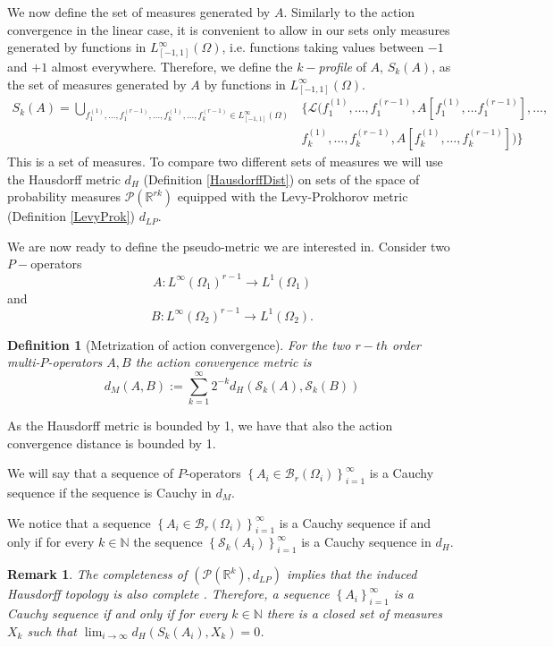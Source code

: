 \documentclass[11pt]{article}
\newtheorem{definition}[theorem]{Definition}
\newtheorem{remark}[theorem]{Remark}
\begin{document}
We now define the set of measures generated by $A$. Similarly to the action convergence in the linear case, it is convenient to allow in our sets only measures generated by functions in $L_{[-1,1]}^{\infty}(\Omega)$, i.e. functions taking values between $-1$ and $+1$ almost everywhere. Therefore, we define the $k-$\emph{profile} of $A$,  $S_k(A)$, as the set of measures generated by $A$ by functions in  $L_{[-1,1]}^{\infty}(\Omega)$.
$$
\begin{aligned}
S_k(A)=\bigcup_{f^{(1)}_1,\ldots, f^{(r-1)}_1,\ldots, f^{(1)}_k,\ldots,f^{(r-1)}_k\in L_{[-1,1]}^{\infty}(\Omega)}&\{\mathcal{L}
(f^{(1)}_1,\ldots, f^{(r-1)}_1,A[f^{(1)}_1,\ldots f^{(r-1)}_1],\ldots,\\
&f^{(1)}_k,\ldots,f^{(r-1)}_k,A[f^{(1)}_k,\ldots,f^{(r-1)}_k])\}
\end{aligned}
$$This is a set of measures. To compare two different sets of measures we will use the Hausdorff metric $d_H$ (Definition	\ref{HausdorffDist}) on sets of the space of probability measures $\mathcal{P}(\mathbb{R}^{rk})$ equipped with the Levy-Prokhorov metric (Definition \ref{LevyProk}) $d_{LP}$. 

We are now ready to define the pseudo-metric we are interested in.
Consider two $P-$operators 
$$
A: L^{\infty}(\Omega_1)^{r-1}\rightarrow L^1(\Omega_1)
$$and
$$
B: L^{\infty}(\Omega_2)^{r-1}\rightarrow L^1(\Omega_2).
$$
\begin{definition}[Metrization of action convergence] For the two $r-th$ order multi-$P$-operators $A, B$ the \emph{action convergence metric} is
$$
d_{M}(A, B):=\sum_{k=1}^{\infty} 2^{-k} d_{H}\left(\mathcal{S}_{k}(A), \mathcal{S}_{k}(B)\right)
$$
\end{definition}

As the Hausdorff metric is bounded by 1, we have that also the action convergence distance is bounded by 1.


We will say that a sequence of $P$-operators $\left\{A_i \in \mathcal{B}_r\left(\Omega_i\right)\right\}_{i=1}^{\infty}$ is a Cauchy sequence if the sequence is Cauchy in $d_M$. \newline


We notice that a sequence $\left\{A_i \in \mathcal{B}_r\left(\Omega_i\right)\right\}_{i=1}^{\infty}$ is a Cauchy sequence  if and only if for every $k \in \mathbb{N}$ the sequence $\left\{\mathcal{S}_k\left(A_i\right)\right\}_{i=1}^{\infty}$ is a Cauchy sequence in $d_H$.
 

\begin{remark} The completeness of $\left(\mathcal{P}\left(\mathbb{R}^k\right), d_{L P}\right)$ implies that the induced Hausdorff topology is also complete \cite{RealAnalysisGordon}. Therefore, a sequence $\left\{A_i\right\}_{i=1}^{\infty}$ is a Cauchy sequence if and only if for every $k \in \mathbb{N}$ there is a closed set of measures $X_k$ such that $\lim _{i \rightarrow \infty} d_H\left(S_k\left(A_i\right), X_k\right)=0$.
 \end{remark}
 
\end{document}

